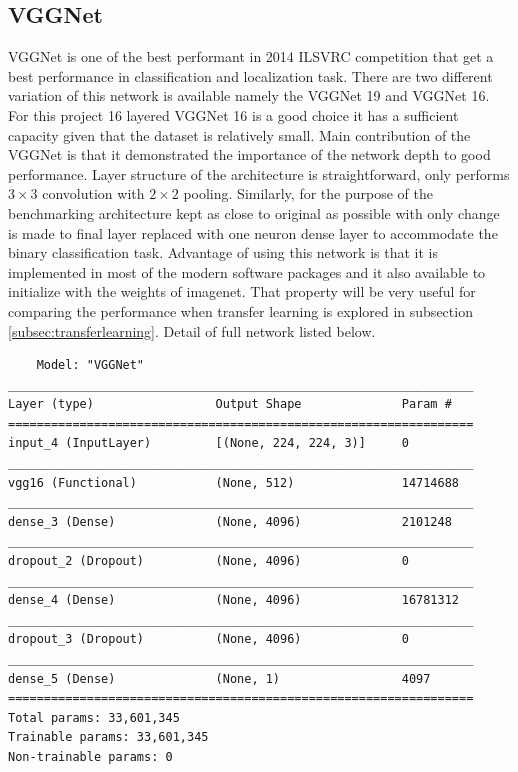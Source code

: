 \subsection{VGGNet}
VGGNet is one of the best performant in 2014 ILSVRC competition that get a best performance in classification and localization task.
There are two different variation of this network is available namely the VGGNet 19 and VGGNet 16. 
For this project 16 layered VGGNet 16 is a good choice it has a sufficient capacity given that the dataset is relatively small.
Main contribution of the VGGNet is that it demonstrated the importance of the network depth to good performance.
Layer structure of the architecture is straightforward, only performs $3 \times 3$ convolution with $2 \times 2$ pooling.
Similarly, for the purpose of the benchmarking architecture kept as close to original as possible with only change is made to final layer replaced with one neuron dense layer to accommodate the binary classification task.
Advantage of using this network is that it is implemented in most of the modern software packages and it also available to initialize with the weights of imagenet. 
That property will be very useful for comparing the performance when transfer learning is explored in subsection \ref{subsec:transferlearning}.
Detail of full network listed below.

\begin{verbatim}
    Model: "VGGNet"
_________________________________________________________________
Layer (type)                 Output Shape              Param #   
=================================================================
input_4 (InputLayer)         [(None, 224, 224, 3)]     0         
_________________________________________________________________
vgg16 (Functional)           (None, 512)               14714688  
_________________________________________________________________
dense_3 (Dense)              (None, 4096)              2101248   
_________________________________________________________________
dropout_2 (Dropout)          (None, 4096)              0         
_________________________________________________________________
dense_4 (Dense)              (None, 4096)              16781312  
_________________________________________________________________
dropout_3 (Dropout)          (None, 4096)              0         
_________________________________________________________________
dense_5 (Dense)              (None, 1)                 4097      
=================================================================
Total params: 33,601,345
Trainable params: 33,601,345
Non-trainable params: 0

\end{verbatim}

